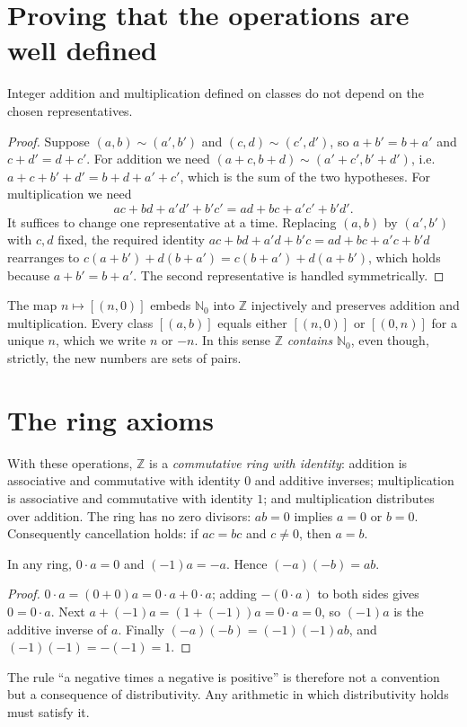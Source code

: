 \section{Proving that the operations are well defined}
\begin{proposition}
Integer addition and multiplication defined on classes do not depend on the chosen representatives.
\end{proposition}
\begin{proof}
Suppose $(a,b)\sim(a',b')$ and $(c,d)\sim(c',d')$, so $a+b'=b+a'$ and $c+d'=d+c'$. For addition we need $(a+c,b+d)\sim(a'+c',b'+d')$, i.e.\ $a+c+b'+d'=b+d+a'+c'$, which is the sum of the two hypotheses. For multiplication we need
\[
ac+bd+a'd'+b'c'=ad+bc+a'c'+b'd'.
\]
It suffices to change one representative at a time. Replacing $(a,b)$ by $(a',b')$ with $c,d$ fixed, the required identity $ac+bd+a'd+b'c=ad+bc+a'c+b'd$ rearranges to $c(a+b')+d(b+a')=c(b+a')+d(a+b')$, which holds because $a+b'=b+a'$. The second representative is handled symmetrically.
\end{proof}

The map $n\mapsto[(n,0)]$ embeds $\mathbb N_0$ into $\mathbb Z$ injectively and preserves addition and multiplication. Every class $[(a,b)]$ equals either $[(n,0)]$ or $[(0,n)]$ for a unique $n$, which we write $n$ or $-n$. In this sense $\mathbb Z$ \emph{contains} $\mathbb N_0$, even though, strictly, the new numbers are sets of pairs.

\section{The ring axioms}
With these operations, $\mathbb Z$ is a \emph{commutative ring with identity}: addition is associative and commutative with identity $0$ and additive inverses; multiplication is associative and commutative with identity $1$; and multiplication distributes over addition. The ring has no zero divisors: $ab=0$ implies $a=0$ or $b=0$. Consequently cancellation holds: if $ac=bc$ and $c\ne0$, then $a=b$.

\begin{proposition}
In any ring, $0\cdot a=0$ and $(-1)a=-a$. Hence $(-a)(-b)=ab$.
\end{proposition}
\begin{proof}
$0\cdot a=(0+0)a=0\cdot a+0\cdot a$; adding $-(0\cdot a)$ to both sides gives $0=0\cdot a$. Next $a+(-1)a=(1+(-1))a=0\cdot a=0$, so $(-1)a$ is the additive inverse of $a$. Finally $(-a)(-b)=(-1)(-1)ab$, and $(-1)(-1)=-(-1)=1$.
\end{proof}
The rule ``a negative times a negative is positive'' is therefore not a convention but a consequence of distributivity. Any arithmetic in which distributivity holds must satisfy it.

